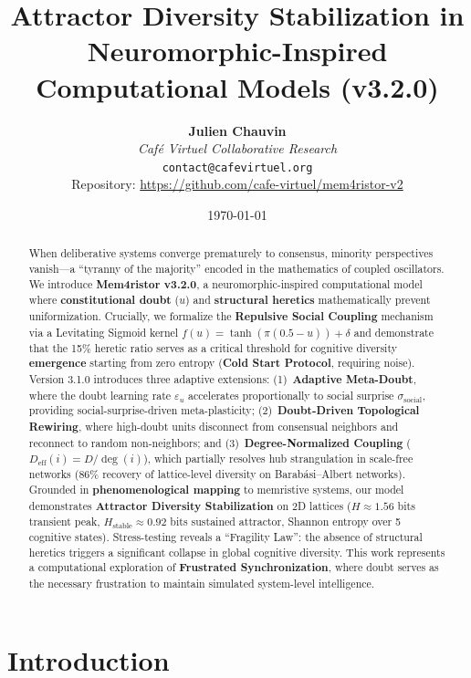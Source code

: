 \documentclass[11pt]{article}
\title{Attractor Diversity Stabilization in Neuromorphic-Inspired Computational Models (v3.2.0)}
\author{
    \textbf{Julien Chauvin} \\
    \textit{Café Virtuel Collaborative Research} \\
    \medskip
    \small{\texttt{contact@cafevirtuel.org}} \\
    \small{Repository: \url{https://github.com/cafe-virtuel/mem4ristor-v2}}
}
\date{\today}
\begin{document}
\maketitle

\begin{abstract}
When deliberative systems converge prematurely to consensus, minority perspectives vanish---a ``tyranny of the majority'' encoded in the mathematics of coupled oscillators. We introduce \textbf{Mem4ristor v3.2.0}, a neuromorphic-inspired computational model where \textbf{constitutional doubt} ($u$) and \textbf{structural heretics} mathematically prevent uniformization. Crucially, we formalize the \textbf{Repulsive Social Coupling} mechanism via a Levitating Sigmoid kernel $f(u) = \tanh(\pi(0.5-u)) + \delta$ and demonstrate that the 15\% heretic ratio serves as a critical threshold for cognitive diversity \textbf{emergence} starting from zero entropy (\textbf{Cold Start Protocol}, requiring noise). Version 3.1.0 introduces three adaptive extensions: (1)~\textbf{Adaptive Meta-Doubt}, where the doubt learning rate $\varepsilon_u$ accelerates proportionally to social surprise $\sigma_{\text{social}}$, providing social-surprise-driven meta-plasticity; (2)~\textbf{Doubt-Driven Topological Rewiring}, where high-doubt units disconnect from consensual neighbors and reconnect to random non-neighbors; and (3)~\textbf{Degree-Normalized Coupling} ($D_{\text{eff}}(i) = D/\deg(i)$), which partially resolves hub strangulation in scale-free networks (86\% recovery of lattice-level diversity on Barab\'asi--Albert networks). Grounded in \textbf{phenomenological mapping} to memristive systems, our model demonstrates \textbf{Attractor Diversity Stabilization} on 2D lattices ($H \approx 1.56$ bits transient peak, $H_{\text{stable}} \approx 0.92$ bits sustained attractor, Shannon entropy over 5 cognitive states). Stress-testing reveals a ``Fragility Law'': the absence of structural heretics triggers a significant collapse in global cognitive diversity. This work represents a computational exploration of \textbf{Frustrated Synchronization}, where doubt serves as the necessary frustration to maintain simulated system-level intelligence.
\end{abstract}

\section{Introduction}
\end{document}
